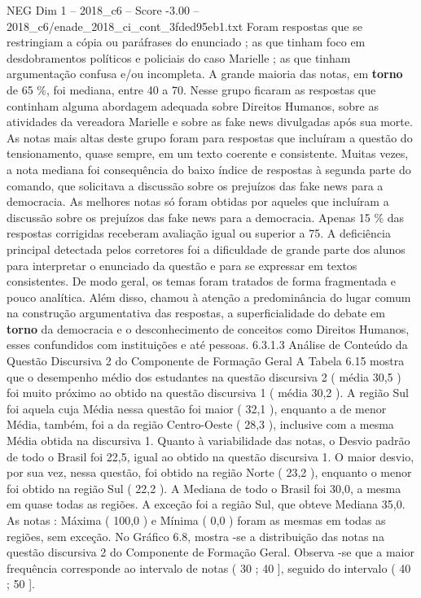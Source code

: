 \begin{textsample}{NEG Dim 1 – 2018\_c6 – Score -3.00 – 2018\_c6/enade\_2018\_ci\_cont\_3fded95eb1.txt}
Foram respostas que se restringiam a cópia ou paráfrases do enunciado ; as que tinham foco em desdobramentos políticos e policiais do caso Marielle ; as que tinham argumentação confusa e/ou incompleta.
A grande maioria das notas, em \textbf{torno} de 65 \%, foi mediana, entre 40 a 70.
Nesse grupo ficaram as respostas que continham alguma abordagem adequada sobre Direitos Humanos, sobre as atividades da vereadora Marielle e sobre as fake news divulgadas após sua morte.
As notas mais altas deste grupo foram para respostas que incluíram a questão do tensionamento, quase sempre, em um texto coerente e consistente.
Muitas vezes, a nota mediana foi consequência do baixo índice de respostas à segunda parte do comando, que solicitava a discussão sobre os prejuízos das fake news para a democracia.
As melhores notas só foram obtidas por aqueles que incluíram a discussão sobre os prejuízos das fake news para a democracia.
Apenas 15 \% das respostas corrigidas receberam avaliação igual ou superior a 75.
A deficiência principal detectada pelos corretores foi a dificuldade de grande parte dos alunos para interpretar o enunciado da questão e para se expressar em textos consistentes.
De modo geral, os temas foram tratados de forma fragmentada e pouco analítica.
Além disso, chamou à atenção a predominância do lugar comum na construção argumentativa das respostas, a superficialidade do debate em \textbf{torno} da democracia e o desconhecimento de conceitos como Direitos Humanos, esses confundidos com instituições e até pessoas. 6.3.1.3 Análise de Conteúdo da Questão Discursiva 2 do Componente de Formação Geral A Tabela 6.15 mostra que o desempenho médio dos estudantes na questão discursiva 2 ( média 30,5 ) foi muito próximo ao obtido na questão discursiva 1 ( média 30,2 ).
A região Sul foi aquela cuja Média nessa questão foi maior ( 32,1 ), enquanto a de menor Média, também, foi a da região Centro-Oeste ( 28,3 ), inclusive com a mesma Média obtida na discursiva 1.
Quanto à variabilidade das notas, o Desvio padrão de todo o Brasil foi 22,5, igual ao obtido na questão discursiva 1.
O maior desvio, por sua vez, nessa questão, foi obtido na região Norte ( 23,2 ), enquanto o menor foi obtido na região Sul ( 22,2 ).
A Mediana de todo o Brasil foi 30,0, a mesma em quase todas as regiões.
A exceção foi a região Sul, que obteve Mediana 35,0.
As notas : Máxima ( 100,0 ) e Mínima ( 0,0 ) foram as mesmas em todas as regiões, sem exceção.
No Gráfico 6.8, mostra -se a distribuição das notas na questão discursiva 2 do Componente de Formação Geral.
Observa -se que a maior frequência corresponde ao intervalo de notas ( 30 ; 40 ], seguido do intervalo ( 40 ; 50 ].

\end{textsample}

